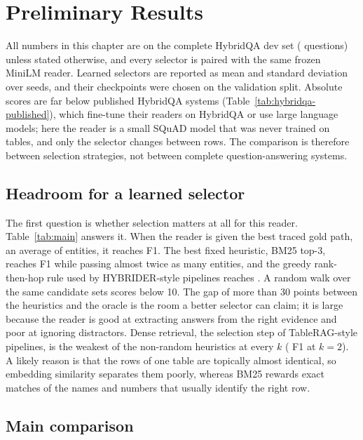 \chapter{Preliminary Results}
\label{ch:results}

All numbers in this chapter are on the complete HybridQA dev set (\nTest{} questions) unless stated otherwise, and every selector is paired with the same frozen MiniLM reader. Learned selectors are reported as mean and standard deviation over seeds, and their checkpoints were chosen on the validation split. Absolute scores are far below published HybridQA systems (Table~\ref{tab:hybridqa-published}), which fine-tune their readers on HybridQA or use large language models; here the reader is a small SQuAD model that was never trained on tables, and only the selector changes between rows. The comparison is therefore between selection strategies, not between complete question-answering systems.

\section{Headroom for a learned selector}
\label{sec:headroom}

The first question is whether selection matters at all for this reader. Table~\ref{tab:main} answers it. When the reader is given the best traced gold path, an average of \itemsOracle{} entities, it reaches \fOracle{} F1. The best fixed heuristic, BM25 top-3, reaches \fBmThree{} F1 while passing almost twice as many entities, and the greedy rank-then-hop rule used by HYBRIDER-style pipelines reaches \fGreedy{}. A random walk over the same candidate sets scores below 10. The gap of more than 30 points between the heuristics and the oracle is the room a better selector can claim; it is large because the reader is good at extracting answers from the right evidence and poor at ignoring distractors. Dense retrieval, the selection step of TableRAG-style pipelines, is the weakest of the non-random heuristics at every $k$ (\fDenseTwo{} F1 at $k=2$). A likely reason is that the rows of one table are topically almost identical, so embedding similarity separates them poorly, whereas BM25 rewards exact matches of the names and numbers that usually identify the right row.



\section{Main comparison}

